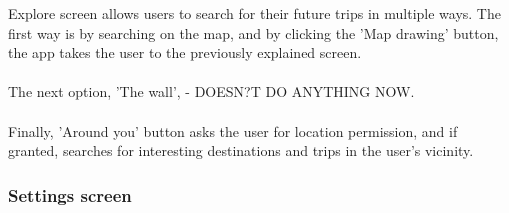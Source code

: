 Explore screen allows users to search for their future trips in multiple ways. The first way is by searching on the map, and by clicking the 'Map drawing' button, the app takes the user to the previously explained screen.\\ \\
The next option, 'The wall',  - DOESN?T DO ANYTHING NOW. \\ \\
Finally, 'Around you' button asks the user for location permission, and if granted, searches for interesting destinations and trips in the user's vicinity.
 
\newpage
\subsubsection{Settings screen}
\begin{figure}[!htb]
\centering
\begin{minipage}{.48\textwidth}
\centering

\end{minipage}
\end{figure}

